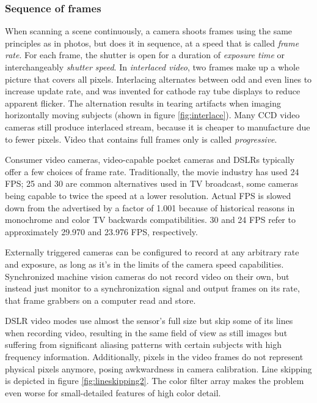 \subsubsection{Sequence of frames} %


When scanning a scene continuously, a camera shoots frames using the same principles as in photos, but does it in sequence, at a speed that is called \emph{frame rate}.
For each frame, the shutter is open for a duration of \emph{exposure time} or interchangeably \emph{shutter speed}.
In \emph{interlaced video}, two frames make up a whole picture that covers all pixels.
Interlacing alternates between odd and even lines to increase update rate, and was invented for cathode ray tube displays to reduce apparent flicker.
The alternation results in tearing artifacts when imaging horizontally moving subjects (shown in figure \ref{fig:interlace}).
Many CCD video cameras still produce interlaced stream, because it is cheaper to manufacture due to fewer pixels.
Video that contains full frames only is called \emph{progressive}.



Consumer video cameras, video-capable pocket cameras and DSLRs typically offer a few choices of frame rate. Traditionally, the movie industry has used 24 FPS; 25 and 30 are common alternatives used in TV broadcast, some cameras being capable to twice the speed at a lower resolution.
Actual FPS is slowed down from the advertised by a factor of 1.001 because of historical reasons in monochrome and color TV backwards compatibilities.
30 and 24 FPS refer to approximately 29.970 and 23.976 FPS, respectively.

Externally triggered cameras can be configured to record at any arbitrary rate and exposure, as long as it's in the limits of the camera speed capabilities.
Synchronized machine vision cameras do not record video on their own, but instead just monitor to a synchronization signal and output frames on its rate, that frame grabbers on a computer read and store.


DSLR video modes use almost the sensor's full size but skip some of its lines when recording video, resulting in the same field of view as still images but suffering from significant aliasing patterns with certain subjects with high frequency information.
Additionally, pixels in the video frames do not represent physical pixels anymore, posing awkwardness in camera calibration.
Line skipping is depicted in figure \ref{fig:lineskipping2}.
The color filter array makes the problem even worse for small-detailed features of high color detail.

